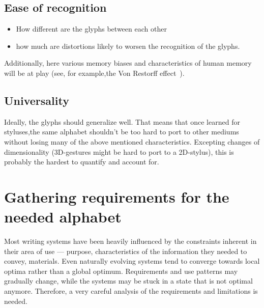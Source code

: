 \documentclass[conference]{IEEEtran}
\begin{document}
\subsection{Ease of recognition}

\begin{itemize} 
        \item How different are the glyphs between each other
        \item how much are distortions likely to worsen the recognition of the glyphs.
\end{itemize}

Additionally,  here various memory biases and characteristics of human memory will be at play (see, for example,the Von Restorff effect~\cite{hunt1995subtlety}).

\subsection{Universality}

Ideally, the glyphs should generalize well. That means that once learned for styluses,the same alphabet shouldn't be too hard to port to other mediums without losing many of the above mentioned characteristics. Excepting changes of dimensionality (3D-gestures might be hard to port to a 2D-stylus), this is probably the hardest to quantify and account for.

\section{Gathering requirements for the needed alphabet}

Most writing systems have been heavily influenced by the constraints inherent in their area of use ---  purpose, characteristics of the information they needed to convey, materials. Even naturally evolving systems tend to converge towards local optima rather than a global optimum. Requirements and use patterns may gradually change, while the systems may be stuck in a state that is not optimal anymore. Therefore, a very careful analysis of the requirements and limitations is needed.
\end{document}
